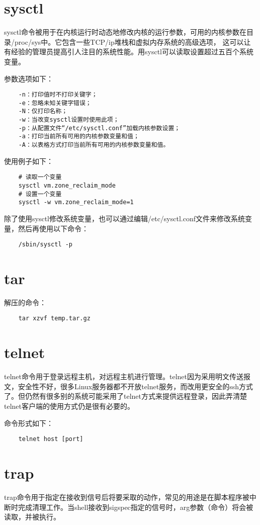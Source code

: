 \documentclass[a4paper,left=2.5cm,right=2.5cm,11pt]{article}
\begin{document}
\section{sysctl}
	sysctl命令被用于在内核运行时动态地修改内核的运行参数，可用的内核参数在目录/proc/sys中。它包含一些TCP/ip堆栈和虚拟内存系统的高级选项， 这可以让有经验的管理员提高引人注目的系统性能。用sysctl可以读取设置超过五百个系统变量。\par

	参数选项如下：
	\begin{lstlisting}
	-n：打印值时不打印关键字； 
	-e：忽略未知关键字错误； 
	-N：仅打印名称； 
	-w：当改变sysctl设置时使用此项； 
	-p：从配置文件“/etc/sysctl.conf”加载内核参数设置； 
	-a：打印当前所有可用的内核参数变量和值； 
	-A：以表格方式打印当前所有可用的内核参数变量和值。
	\end{lstlisting}

	使用例子如下：
	\begin{lstlisting}
	# 读取一个变量
	sysctl vm.zone_reclaim_mode
	# 设置一个变量
	sysctl -w vm.zone_reclaim_mode=1
	\end{lstlisting}

	除了使用sysctl修改系统变量，也可以通过编辑/etc/sysctl.conf文件来修改系统变量，然后再使用以下命令：
	\begin{lstlisting}
	/sbin/sysctl -p
	\end{lstlisting}

\section{tar}
	解压的命令：
	\begin{lstlisting}
	tar xzvf temp.tar.gz
	\end{lstlisting}

\section{telnet}
	telnet命令用于登录远程主机，对远程主机进行管理。telnet因为采用明文传送报文，安全性不好，很多Linux服务器都不开放telnet服务，而改用更安全的ssh方式了。但仍然有很多别的系统可能采用了telnet方式来提供远程登录，因此弄清楚telnet客户端的使用方式仍是很有必要的。\par

	命令形式如下：
	\begin{lstlisting}
	telnet host [port]
	\end{lstlisting}

\section{trap}
	trap命令用于指定在接收到信号后将要采取的动作，常见的用途是在脚本程序被中断时完成清理工作。当shell接收到sigspec指定的信号时，arg参数（命令）将会被读取，并被执行。\par
\end{document}
